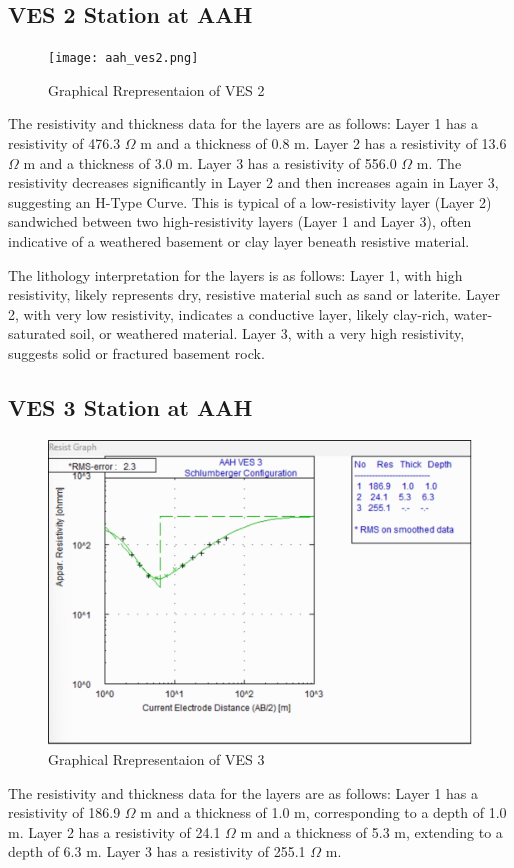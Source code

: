 \documentclass[12pt,a4paper]{report}
\begin{document}
\subsection{VES 2 Station at AAH}

\begin{figure}[H]
    \centering
    \texttt{[image: aah\_ves2.png]}
    \caption{Graphical Rrepresentaion of VES 2}
    \label{fig:AAH_VES_2_Curve}
\end{figure}

The resistivity and thickness data for the layers are as follows: Layer 1 has a resistivity of 476.3 $\Omega$ m and a thickness of 0.8 m. Layer 2 has a resistivity of 13.6 $\Omega$ m and a thickness of 3.0 m. Layer 3 has a resistivity of 556.0 $\Omega$ m. The resistivity decreases significantly in Layer 2 and then increases again in Layer 3, suggesting an H-Type Curve. This is typical of a low-resistivity layer (Layer 2) sandwiched between two high-resistivity layers (Layer 1 and Layer 3), often indicative of a weathered basement or clay layer beneath resistive material.

The lithology interpretation for the layers is as follows: Layer 1, with high resistivity, likely represents dry, resistive material such as sand or laterite. Layer 2, with very low resistivity, indicates a conductive layer, likely clay-rich, water-saturated soil, or weathered material. Layer 3, with a very high resistivity, suggests solid or fractured basement rock.

\subsection{VES 3 Station at AAH}

\begin{figure}[H]
    \centering
    \includegraphics[width=1.0\textwidth]{aah_ves3.png}
    \caption{Graphical Rrepresentaion of VES 3}
    \label{fig:AAH_VES_3_Curve}
\end{figure}
The resistivity and thickness data for the layers are as follows: Layer 1 has a resistivity of 186.9 $\Omega$ m and a thickness of 1.0 m, corresponding to a depth of 1.0 m. Layer 2 has a resistivity of 24.1 $\Omega$ m and a thickness of 5.3 m, extending to a depth of 6.3 m. Layer 3 has a resistivity of 255.1 $\Omega$ m.
\end{document}
